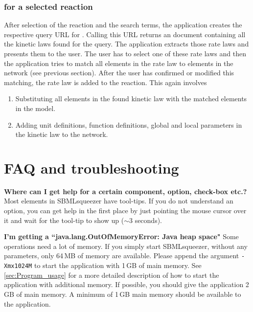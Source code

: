 \subsection{\SABIO for a selected reaction}
After selection of the reaction and the search terms, the application creates the respective query URL for \SABIO. 
Calling this URL returns an \SBML document containing all the kinetic laws found for the query. 
The application extracts those rate laws and presents them to the user. 
The user has to select one of these rate laws and then the application tries to match all \SBML elements in the rate law to elements in the network (see previous section). 
After the user has confirmed or modified this matching, the rate law is added to the reaction. 
This again involves
\begin{enumerate}
\item
Substituting all elements in the found kinetic law with the matched elements in the model.
\item
Adding unit definitions, function definitions, global and local parameters in the kinetic law to the network.
\end{enumerate}


\chapter{\acs{FAQ} and troubleshooting}
\label{ch:faq}


\noindent \textbf{Where can I get help for a certain component, option, check-box etc.?}\newline
Most elements in SBMLsqueezer have tool-tips. If you do not understand an option, you
can get help in the first place by just pointing the mouse cursor over it and
wait for the tool-tip to show up ($\sim$3 seconds).\newline

\noindent \textbf{I'm getting a ``java.lang.OutOfMemoryError: Java heap space"}\newline
Some operations need a lot of memory. If you simply start SBMLsqueezer, without any
\JVM parameters, only 64\,MB of memory are available. Please append the argument
\texttt{-Xmx1024M} to start the application with 1\,GB of main memory. See
\vref{sec:Program_usage} for a more detailed description of how to
start the application with additional memory. If possible, you should give the
application 2\,GB of main memory. A minimum of 1\,GB main memory should be
available to the application.\newline


